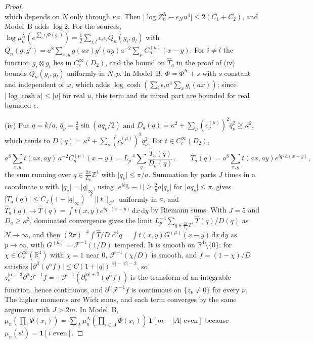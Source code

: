 \documentclass[11pt,a4paper]{amsart}
\theoremstyle{definition}
\theoremstyle{remark}
\numberwithin{equation}{section}
\newcommand{\R}{\mathbb{R}}          %
\newcommand{\Z}{\mathbb{Z}}          %
\newcommand{\norm}[1]{\lVert #1\rVert}     %
\newcommand{\abs}[1]{\lvert #1\rvert}      %
\newcommand{\dd}{\,\mathrm{d}}             %
\newcommand{\Lp}{L_p}                      %
\begin{document}
\begin{proof}
\[\]
which depends on $N$ only through $\kappa a$. Then $\abs{\log Z^{\mathrm A}_n-e_Nn^4}\le2(C_1+C_2)$, and Model~B adds $\log2$. For the sources, $\log\mu^{\mathrm A}_n(e^{\sum_i\epsilon_i\Phi(g_i)})=\frac12\sum_{i,l}\epsilon_i\epsilon_lQ_n(g_i,g_l)$ with $Q_n(g,g')=a^8\sum_{x,y}g(ax)g'(ay)a^{-2}\sum_\mu C^{(\mu)}_n(x-y)$. For $i\ne l$ the function $g_i\otimes g_l$ lies in $C^\infty_c(D_2)$, and the bound on $\widehat T_a$ in the proof of (iv) bounds $Q_n(g_i,g_l)$ uniformly in $N,p$. In Model~B, $\Phi=\Phi^{\mathrm A}+s$ with $s$ constant and independent of $\varphi$, which adds $\log\cosh(\sum_i\epsilon_ia^4\sum_xg_i(ax))$; since $\abs{\log\cosh u}\le\abs u$ for real $u$, this term and its mixed part are bounded for real bounded $\epsilon$.

(iv) Put $q=k/a$, $\hat q_\nu=\frac2a\sin(aq_\nu/2)$ and $D_a(q)=\kappa^2+\sum_\nu(c^{(\mu)}_\nu)^2\hat q_\nu^2\ge\kappa^2$, which tends to $D(q)=\kappa^2+\sum_\nu(c^{(\mu)}_\nu)^2q_\nu^2$. For $t\in C^\infty_c(D_2)$,
\[
a^8\sum_{x,y}t(ax,ay)\,a^{-2}C^{(\mu)}_n(x-y)=\Lp^{-4}\sum_q\frac{\widehat T_a(q)}{D_a(q)},\qquad\widehat T_a(q)=a^8\sum_{x,y}t(ax,ay)e^{iq\cdot a(x-y)},
\]
the sum running over $q\in\frac{2\pi}{\Lp}\Z^4$ with $\abs{q_\nu}\le\pi/a$. Summation by parts $J$ times in a coordinate $\nu$ with $\abs{q_\nu}=\abs q_\infty$, using $\abs{e^{iaq_\nu}-1}\ge\frac2\pi a\abs{q_\nu}$ for $\abs{aq_\nu}\le\pi$, gives $\abs{\widehat T_a(q)}\le C_J(1+\abs q_\infty)^{-J}\norm t_{C^J}$ uniformly in $a$, and $\widehat T_a(q)\to\hat T(q)=\int t(x,y)e^{iq\cdot(x-y)}\dd x\dd y$ by Riemann sums. With $J=5$ and $D_a\ge\kappa^2$, dominated convergence gives the limit $\Lp^{-4}\sum_{q\in\frac{2\pi}{\Lp}\Z^4}\hat T(q)/D(q)$ as $N\to\infty$, and then $(2\pi)^{-4}\int\hat T/D\,\dd^4q=\int t(x,y)G^{(\mu)}(x-y)\dd x\dd y$ as $p\to\infty$, with $G^{(\mu)}=\mathcal F^{-1}(1/D)$ tempered. It is smooth on $\R^4\setminus\{0\}$: for $\chi\in C^\infty_c(\R^4)$ with $\chi=1$ near $0$, $\mathcal F^{-1}(\chi/D)$ is smooth, and $f=(1-\chi)/D$ satisfies $\abs{\partial^\beta(q^\alpha f)}\le C(1+\abs q)^{\abs\alpha-\abs\beta-2}$, so $z_\nu^{\abs\alpha+3}\partial^\alpha\mathcal F^{-1}f=\pm\mathcal F^{-1}(\partial_\nu^{\abs\alpha+3}(q^\alpha f))$ is the transform of an integrable function, hence continuous, and $\partial^\alpha\mathcal F^{-1}f$ is continuous on $\{z_\nu\ne0\}$ for every $\nu$. The higher moments are Wick sums, and each term converges by the same argument with $J>2m$. In Model~B, $\mu_n(\prod_i\Phi(x_i))=\sum_A\mu^{\mathrm A}_n(\prod_{i\in A}\Phi(x_i))\,\mathbf 1[m-\abs A\text{ even}]$ because $\mu_n(s^i)=\mathbf 1[i\text{ even}]$.


\end{proof}
\end{document}
